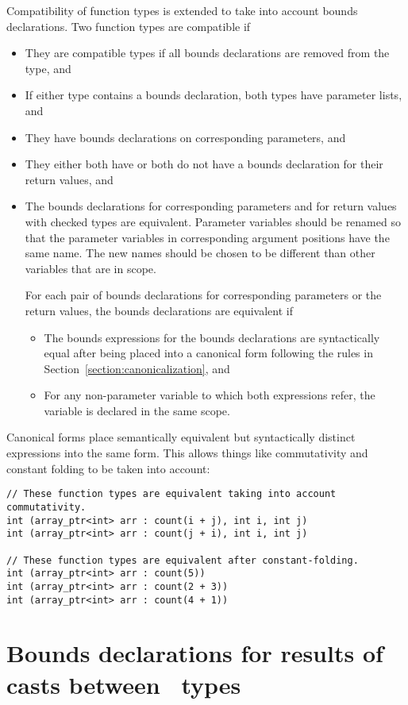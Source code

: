 Compatibility of function types is extended to take into account
bounds declarations.  Two function types are compatible if
\begin{itemize}
\item They are compatible types if all bounds declarations are removed from the type, and
\item If either type contains a bounds declaration, both types have parameter lists, and
\item They have bounds declarations on corresponding parameters, and
\item They either both have or both do not have a bounds declaration for their return values, and
\item The bounds declarations for corresponding parameters and for return values with
checked types are equivalent.
Parameter variables should be renamed so that the parameter variables
in corresponding argument positions have the same name.  The new names should be chosen
to be different than other variables that are in scope.

For each pair of bounds declarations for corresponding
parameters or the return values, the bounds declarations are equivalent if
\begin{itemize}
\item The bounds expressions for the bounds declarations are syntactically equal
after being placed into a canonical form following the rules in Section~\ref{section:canonicalization}, and
\item  For any non-parameter variable  to which both expressions refer, the variable is
declared in the same scope.
\end{itemize}
\end{itemize}

Canonical forms place semantically equivalent but syntactically distinct
expressions into the same form.  This allows things like commutativity and constant
folding to be taken into account:
\begin{lstlisting}
// These function types are equivalent taking into account commutativity.
int (array_ptr<int> arr : count(i + j), int i, int j)
int (array_ptr<int> arr : count(j + i), int i, int j)

// These function types are equivalent after constant-folding.
int (array_ptr<int> arr : count(5))
int (array_ptr<int> arr : count(2 + 3))
int (array_ptr<int> arr : count(4 + 1))
\end{lstlisting}

\section{Bounds declarations for results of casts between \plainarrayptr\ types}
\label{section:pointer-cast-results}

